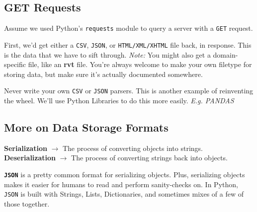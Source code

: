 \documentclass[english, 10pt]{article}
\begin{document}
\subsection{GET Requests}

Assume we used Python's \texttt{requests} module to query a server with a \texttt{GET} request.\newline

First, we'd get either a \texttt{CSV}, \texttt{JSON}, or \texttt{HTML/XML/XHTML} file back, in response. This is the data that we have to sift through. \textit{Note:} You might also get a domain-specific file, like an \textbf{rvt} file. You're always welcome to make your own filetype for storing data, but make sure it's actually documented somewhere.\newline

\begin{tcolorbox}[title=Aside: Parsing CSVs and JSON,colframe=black,colback=white,arc=0pt,fonttitle=\bfseries]
Never write your own \texttt{CSV} or \texttt{JSON} parsers. This is another example of reinventing the wheel. We'll use Python Libraries to do this more easily. \textit{E.g. PANDAS}
\end{tcolorbox}

\subsection{More on Data Storage Formats}

\begin{tcolorbox}[title=Definition:,colframe=red!75!black,colback=red!5!white,arc=0pt,fonttitle=\bfseries]
\textbf{Serialization} $\rightarrow$ The process of converting objects into strings.\newline
\textbf{Deserialization} $\rightarrow$ The process of converting strings back into objects.
\end{tcolorbox}

\textbf{\texttt{JSON}} is a pretty common format for serializing objects. Plus, serializing objects makes it easier for humans to read and perform sanity-checks on. In Python, \texttt{JSON} is built with Strings, Lists, Dictionaries, and sometimes mixes of a few of those together.\newline
\end{document}
